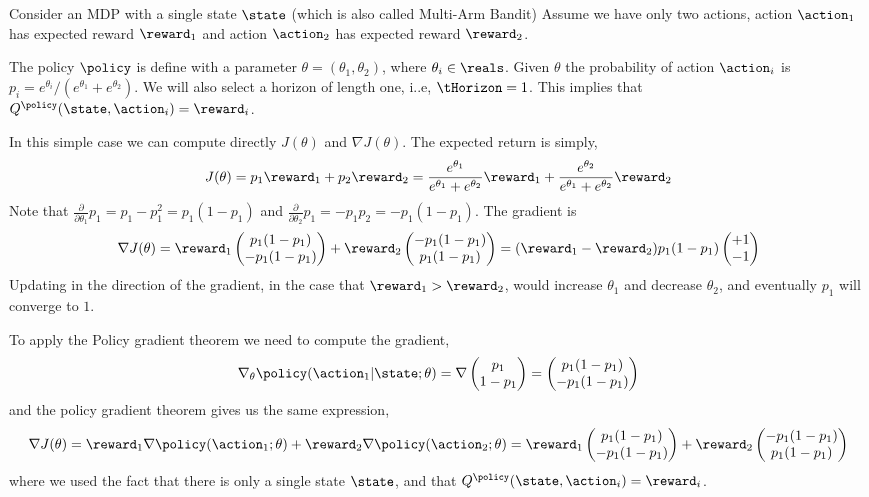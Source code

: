 \begin{example}
Consider an MDP with a single state $\state$ (which is also called
Multi-Arm Bandit)
Assume we have only two actions, action $\action_1$ has expected
reward $\reward_1$ and action $\action_2$ has expected reward
$\reward_2$.

The policy $\policy$ is define with a parameter
$\theta=(\theta_1,\theta_2)$, where $\theta_i\in \reals$. Given
$\theta$ the probability of action $\action_i$ is
$p_i=e^{\theta_i}/(e^{\theta_1}+e^{\theta_2})$. We will also select
a horizon of length one, i..e, $\tHorizon=1$. This implies that
$Q^\policy(\state,\action_i)=\reward_i$.

In this simple case we can compute directly $J(\theta)$ and $\nabla
J(\theta)$. The expected return is simply,
\[
J(\theta)=p_1 \reward_1 + p_2 \reward_2 =
\frac{e^{\theta_1}}{e^{\theta_1}+e^{\theta_2}} \reward_1 +
\frac{e^{\theta_2}}{e^{\theta_1}+e^{\theta_2}} \reward_2
\]
Note that $\frac{\partial}{\partial \theta_1} p_1=
p_1-p_1^2=p_1(1-p_1) $ and $\frac{\partial }{\partial \theta_2} p_1=
- p_1 p_2= -p_1(1-p_1)$. The gradient is
\[
\nabla J(\theta)= \reward_1 \begin{pmatrix} p_1(1-p_1)\\
-p_1(1-p_1)\end{pmatrix} + \reward_2 \begin{pmatrix} -p_1(1-p_1)\\
p_1(1-p_1)\end{pmatrix} = (\reward_1-\reward_2) p_1(1-p_1) \begin{pmatrix}+1\\
-1\end{pmatrix}
\]
Updating in the direction of the gradient, in the case that
$\reward_1>\reward_2$, would increase $\theta_1$ and decrease
$\theta_2$, and eventually $p_1$ will converge to $1$.

To apply the Policy gradient theorem we need to compute the
gradient,
\[
\nabla_\theta \policy(\action_1|\state;\theta) = \nabla \begin{pmatrix} p_1\\
1-p_1\end{pmatrix}=  \begin{pmatrix} p_1(1-p_1)\\
-p_1(1-p_1)\end{pmatrix}
\]
and the policy gradient theorem gives us the same expression,
\[
\nabla J(\theta) = \reward_1 \nabla
\policy(\action_1;\theta)+\reward_2 \nabla
\policy(\action_2;\theta)=\reward_1 \begin{pmatrix} p_1(1-p_1)\\
-p_1(1-p_1)\end{pmatrix} + \reward_2 \begin{pmatrix} -p_1(1-p_1)\\
p_1(1-p_1)\end{pmatrix}
\]
where we used the fact that there is only a single state $\state$,
and that $Q^\policy(\state,\action_i)=\reward_i$.
\end{example}

